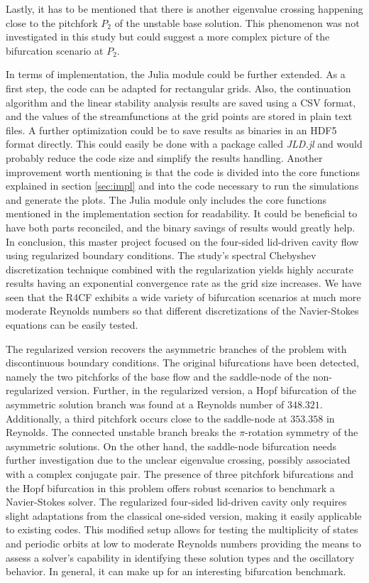 Lastly, it has to be mentioned that there is another eigenvalue crossing
happening close to the pitchfork $P_2$ of the unstable base solution. This
phenomenon was not investigated in this study but could suggest a more complex
picture of the bifurcation scenario at $P_2$.

In terms of implementation, the Julia module could be further extended. As a
first step, the code can be adapted for rectangular grids. Also, the
continuation algorithm and the linear stability analysis results are saved
using a CSV format, and the values of the streamfunctions at the grid points
are stored in plain text files. A further optimization could be to save results
as binaries in an HDF5 format directly. This could easily be done with a
package called \emph{JLD.jl} and would probably reduce the code size and
simplify the results handling. Another improvement worth mentioning is that the
code is divided into the core functions explained in section \ref{sec:impl} and
into the code necessary to run the simulations and generate the plots. The
Julia module only includes the core functions mentioned in the implementation
section for readability. It could be beneficial to have both parts reconciled,
and the binary savings of results would greatly help. \\

In conclusion, this master project focused on the four-sided lid-driven cavity
flow using regularized boundary conditions. The study's spectral Chebyshev
discretization technique combined with the regularization yields highly
accurate results having an exponential convergence rate as the grid size
increases. We have seen that the R4CF exhibits a wide variety of bifurcation
scenarios at much more moderate Reynolds numbers so that different
discretizations of the Navier-Stokes equations can be easily tested.

The regularized version recovers the asymmetric branches of the problem with
discontinuous boundary conditions. The original bifurcations have been
detected, namely the two pitchforks of the base flow and the saddle-node of the
non-regularized version. Further, in the regularized version, a Hopf
bifurcation of the asymmetric solution branch was found at a Reynolds number of
$348.321$. Additionally, a third pitchfork occurs close to the saddle-node at
$353.358$ in Reynolds. The connected unstable branch breaks the $\pi$-rotation
symmetry of the asymmetric solutions. On the other hand, the saddle-node
bifurcation needs further investigation due to the unclear eigenvalue crossing,
possibly associated with a complex conjugate pair. The presence of three
pitchfork bifurcations and the Hopf bifurcation in this problem offers robust
scenarios to benchmark a Navier-Stokes solver. The regularized four-sided
lid-driven cavity only requires slight adaptations from the classical one-sided
version, making it easily applicable to existing codes. This modified setup
allows for testing the multiplicity of states and periodic orbits at low to
moderate Reynolds numbers providing the means to assess a solver's capability
in identifying these solution types and the oscillatory behavior. In general,
it can make up for an interesting bifurcation benchmark.
